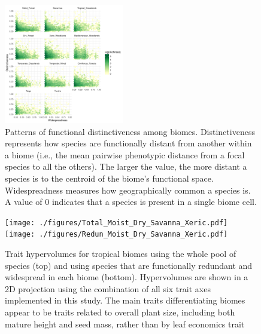 \documentclass[final]{beamer}
\newlength{\twocolwid}
\begin{document}
\begin{frame}[t]
\begin{columns}[t]
\begin{column}{\twocolwid}
\begin{multicols}{2}
\begin{figure}[h]
	\centering
	\includegraphics[width=0.467\textwidth]{./figures/All_biomes_heatmap_logTraits.pdf}
	\caption{ \footnotesize Patterns of functional distinctiveness among biomes. Distinctiveness represents how species are functionally distant from another within a biome (i.e., the mean pairwise phenotypic distance from a focal species to all the others). The larger the value, the more distant a species is to the centroid of the biome's functional space. Widespreadness measures how geographically common a species is. A value of 0 indicates that a species is present in a single biome cell.}
	\label{fig:distinct_common}
\end{figure}


 
\begin{figure}[h]
	\centering
	\texttt{[image: ./figures/Total\_Moist\_Dry\_Savanna\_Xeric.pdf]}\\
	\texttt{[image: ./figures/Redun\_Moist\_Dry\_Savanna\_Xeric.pdf]}
	\caption{ \footnotesize Trait hypervolumes for tropical biomes using the whole pool of species (top) and using species that are functionally redundant and widespread in each biome (bottom).  Hypervolumes are shown in a 2D projection using the combination of all six trait axes implemented in this study. The main traits differentiating biomes appear to be traits related to overall plant size, including both mature height and seed mass, rather than by leaf economics trait}
	\label{fig:hypervolumes2}
\end{figure}


\end{multicols}




\end{column}
\end{columns}
\end{frame}
\end{document}
